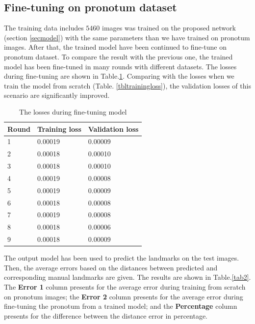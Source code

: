 \documentclass[10pt]{article}
\begin{document}
\subsection{Fine-tuning on pronotum dataset}
The training data includes $5460$ images was trained on the proposed network (section \ref{secmodel}) with the same parameters than we have trained on pronotum images. After that, the trained model have been continued to fine-tune on pronotum dataset. To compare the result with the previous one, the trained model has been fine-tuned in many rounds with different datasets. The losses during fine-tuning are shown in Table.\ref{tblfinetuningloss}. Comparing with the losses when we train the model from scratch (Table. \ref{tbltrainingloss}), the validation losses of this scenario are significantly improved.
\begin{table}[h!]
	\centering
	\begin{tabular}{l l l}
	Round & Training loss & Validation loss \\ \hline
	1 & 0.00019 & 0.00009  \\ \hline
	2 & 0.00018 & 0.00010 \\ \hline
	3 & 0.00018 & 0.00010 \\ \hline
	4 & 0.00019 & 0.00008 \\ \hline
	5 & 0.00019 & 0.00009 \\ \hline
	6 & 0.00018 & 0.00008 \\ \hline
	7 & 0.00019 & 0.00008 \\ \hline
	8 & 0.00018 & 0.00006 \\ \hline
	9 & 0.00018 & 0.00009 \\ \hline
	\end{tabular}
	\caption{The losses during fine-tuning model}
	\label{tblfinetuningloss}
\end{table}

The output model has been used to predict the landmarks on the test images. Then, the average errors based on the distances between predicted and corresponding manual landmarks are given. The results are shown in Table.\ref{tab2}. The \textbf{Error 1} column presents for the average error during training from scratch on pronotum images; the \textbf{Error 2} column presents for the average error during fine-tuning the pronotum from a trained model; and the \textbf{Percentage} column presents for the difference between the distance error in percentage.
\end{document}
